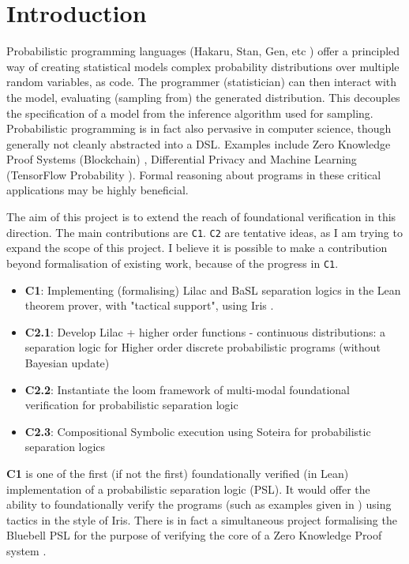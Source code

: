 \chapter{Introduction}
Probabilistic programming languages (Hakaru, Stan, Gen, etc \citep{hakaru, stan, gen}) offer a principled way of 
creating statistical models complex probability distributions
over multiple random variables, as code. The programmer (statistician) can
then interact with the model, evaluating (sampling from) the generated distribution.
This decouples the specification of a model from the inference algorithm used for sampling.
Probabilistic programming is in fact also pervasive in computer science, though generally
not cleanly abstracted into a DSL. Examples include Zero Knowledge Proof Systems (Blockchain) \citep{arklib},
Differential Privacy and Machine Learning (TensorFlow Probability \citep{tfp}). Formal reasoning about programs in
these critical applications may be highly beneficial. 

The aim of this project is to extend the reach of foundational verification in this direction. The main contributions are \texttt{C1}.
\texttt{C2} are tentative ideas, as I am trying to expand the scope of this project. I believe it is possible to make a contribution
beyond formalisation of existing work, because of the progress in \texttt{C1}.
\begin{itemize}
\item \textbf{C1}: Implementing (formalising) Lilac \citep{lilac} and BaSL \citep{basl} separation logics in the Lean theorem prover,
with "tactical support", using Iris \citep{iris}.
\item \textbf{C2.1}: Develop Lilac + higher order functions - continuous distributions: 
a separation logic for Higher order discrete probabilistic programs (without Bayesian update)
\item \textbf{C2.2}: Instantiate the loom framework of multi-modal foundational verification \citep{loom} for probabilistic separation logic
\item \textbf{C2.3}: Compositional Symbolic execution using Soteira \citep{soteira} for probabilistic separation logics
\end{itemize}


\textbf{C1} is one of the first (if not the first) foundationally verified (in Lean) implementation of a probabilistic separation logic (PSL). It would offer
the ability to foundationally verify the programs (such as examples given in \citep{lilac, basl}) using tactics in the style of Iris.
There is in fact a simultaneous project formalising the Bluebell PSL \citep{bluebell-impl} for the purpose of verifying the core of a Zero Knowledge Proof
system \citep{arklib}.

